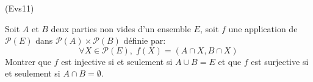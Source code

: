 \begin{tiny}(Evs11)\end{tiny} Soit $A$ et $B$ deux parties non vides d'un ensemble $E$, soit $f$ une application de $\mathcal{P}(E)$ dans $\mathcal{P}(A)\times \mathcal{P}(B) $ définie par:
\begin{displaymath}
\forall X \in \mathcal{P}(E),\; f(X)=(A\cap X,B\cap X)  
\end{displaymath}
Montrer que $f$ est injective si et seulement si $A\cup B=E$ et que $f$ est surjective si et seulement si $A \cap B =\emptyset$.
